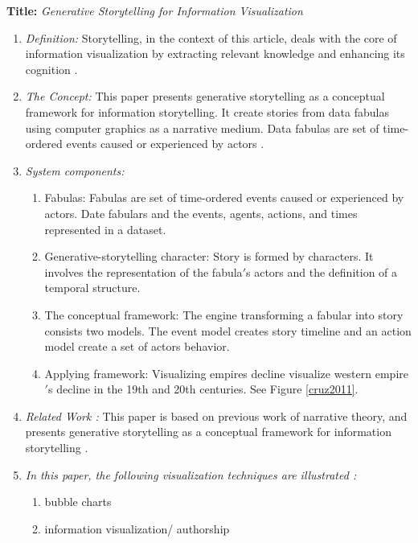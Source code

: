 \documentclass{egpubl}
\begin{document}
\textbf{Title:} \textit{Generative Storytelling for Information Visualization}
\begin{enumerate}
\item \textit{Definition:} Storytelling, in the context of this article, deals with the core of information visualization by extracting relevant knowledge and enhancing its cognition \cite{cruz2011}.
\item \textit{The Concept:} This paper presents generative storytelling as a conceptual framework for information storytelling. It create stories from data fabulas using computer graphics as a narrative medium. Data fabulas are set of time-ordered events caused or experienced by actors \cite{cruz2011}. 

\item  \textit{System components:} 
\begin{enumerate}
\item Fabulas: Fabulas are set of time-ordered events caused or experienced by actors. Date fabulars and the events, agents, actions, and times represented in a dataset.
\item Generative-storytelling character: Story is formed by characters. It involves the representation of the fabula$'$s actors and the definition of a temporal structure.
\item The conceptual framework: The engine transforming a fabular into story consists two models. The event model creates story timeline and an action model create a set of actors behavior.
\item Applying framework: Visualizing empires decline visualize western empire$'$s decline in the 19th and 20th centuries. See Figure \ref{cruz2011}.
\end{enumerate}
\item \textit{Related Work :} This paper is based on  previous work of narrative theory\cite{naratology1985}, and presents generative storytelling as a conceptual framework for information storytelling \cite{cruz2011}.
\item \textit{In this paper, the following visualization techniques are illustrated :} 
\begin{enumerate}
\item bubble charts
\item information visualization/ authorship
\end{enumerate}
\end{enumerate}
\end{document}

